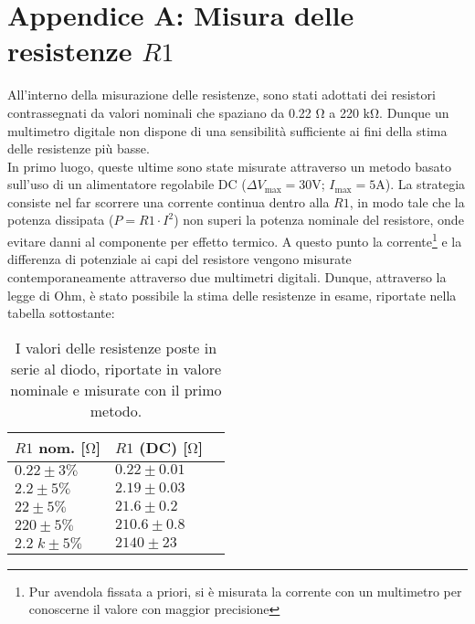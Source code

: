 \documentclass{article}[a4paper, oneside, 11pt]
\begin{document}
\section{Appendice A: Misura delle resistenze $R1$}\label{app: A}

All’interno della misurazione delle resistenze, sono stati adottati dei
resistori contrassegnati da valori nominali che spaziano da 0.22 $\si{\ohm}$
a 220 $\si{\kohm}$. Dunque un multimetro digitale non dispone di una sensibilità
sufficiente ai fini della stima delle resistenze più basse.\\  
In primo luogo, queste ultime sono state misurate attraverso un metodo basato
sull'uso di un alimentatore regolabile DC ($\Delta V_{\text{max}} = 30
\si{\V}$; $I_{\text{max}} = 5 \si{\A}$). La strategia consiste nel far
scorrere una corrente continua dentro alla $R1$, in modo tale che la potenza
dissipata ($P = R1 \cdot I^2$) non superi la potenza nominale del resistore,
onde evitare danni al componente per effetto termico.
A questo punto la corrente\footnote{Pur avendola fissata a priori, si è misurata
la corrente con un multimetro per conoscerne il valore con maggior precisione}
e la differenza di potenziale ai capi del resistore vengono misurate
contemporaneamente attraverso due multimetri digitali. 
Dunque, attraverso la legge di Ohm, è stato possibile la stima delle resistenze
in esame, riportate nella tabella sottostante: 

\begin{table}[H]
	\begin{center}
		\begin{tabular}{lll}
		\toprule
		$R1$ nom. [$\si{\ohm}$] & $R1$ (DC) [$\si{\ohm}$] \\
		\midrule
		\midrule
		$0.22 \pm 3 \% $     & $0.22 \pm 0.01 $ \\
		$2.2 \pm 5 \% $     & $2.19 \pm 0.03 $ \\
		$22 \pm 5 \% $     & $21.6 \pm 0.2 $ \\
		$220 \pm 5 \% $     & $210.6 \pm 0.8 $ \\
		$2.2\; \si{k} \pm 5 \% $ & $2140 \pm 23$ \\
		\bottomrule
    	\end{tabular}
    \caption{I valori delle resistenze poste in serie al diodo, riportate in
        	valore nominale e misurate con il primo metodo. \label{tab:res}}
	\end{center}
\end{table}
\end{document}
